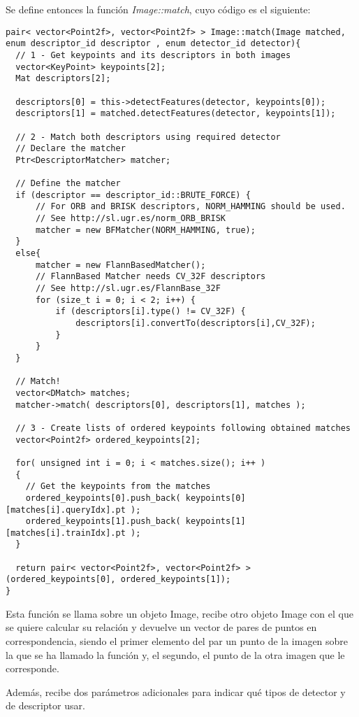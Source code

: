 \documentclass[a4paper, 11pt]{article}
\theoremstyle{definition}
\theoremstyle{theorem}
\begin{document}
  Se define entonces la función \emph{Image::match}, cuyo código es el siguiente:
  \begin{lstlisting}
pair< vector<Point2f>, vector<Point2f> > Image::match(Image matched, enum descriptor_id descriptor , enum detector_id detector){
  // 1 - Get keypoints and its descriptors in both images
  vector<KeyPoint> keypoints[2];
  Mat descriptors[2];

  descriptors[0] = this->detectFeatures(detector, keypoints[0]);
  descriptors[1] = matched.detectFeatures(detector, keypoints[1]);

  // 2 - Match both descriptors using required detector
  // Declare the matcher
  Ptr<DescriptorMatcher> matcher;

  // Define the matcher
  if (descriptor == descriptor_id::BRUTE_FORCE) {
      // For ORB and BRISK descriptors, NORM_HAMMING should be used.
      // See http://sl.ugr.es/norm_ORB_BRISK
      matcher = new BFMatcher(NORM_HAMMING, true);
  }
  else{
      matcher = new FlannBasedMatcher();
      // FlannBased Matcher needs CV_32F descriptors
      // See http://sl.ugr.es/FlannBase_32F
      for (size_t i = 0; i < 2; i++) {
          if (descriptors[i].type() != CV_32F) {
              descriptors[i].convertTo(descriptors[i],CV_32F);
          }
      }
  }

  // Match!
  vector<DMatch> matches;
  matcher->match( descriptors[0], descriptors[1], matches );

  // 3 - Create lists of ordered keypoints following obtained matches
  vector<Point2f> ordered_keypoints[2];

  for( unsigned int i = 0; i < matches.size(); i++ )
  {
    // Get the keypoints from the matches
    ordered_keypoints[0].push_back( keypoints[0][matches[i].queryIdx].pt );
    ordered_keypoints[1].push_back( keypoints[1][matches[i].trainIdx].pt );
  }

  return pair< vector<Point2f>, vector<Point2f> >(ordered_keypoints[0], ordered_keypoints[1]);
}
  \end{lstlisting}

  Esta función se llama sobre un objeto Image, recibe otro objeto Image con el que se quiere calcular su relación y devuelve un vector de pares de puntos en correspondencia, siendo el primer elemento del par un punto de la imagen sobre la que se ha llamado la función y, el segundo, el punto de la otra imagen que le corresponde.

  Además, recibe dos parámetros adicionales para indicar qué tipos de detector y de descriptor usar.
\end{document}
